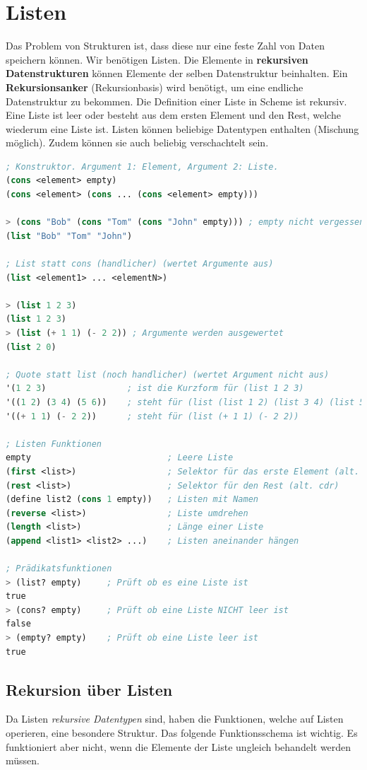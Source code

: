 \newpage

\section{Listen}
Das Problem von Strukturen ist, dass diese nur eine feste Zahl von Daten speichern können. Wir benötigen Listen. Die Elemente in \textbf{rekursiven Datenstrukturen} können Elemente der selben Datenstruktur beinhalten. Ein \textbf{Rekursionsanker} (Rekursionbasis) wird benötigt, um eine endliche Datenstruktur zu bekommen.
Die Definition einer Liste in Scheme ist rekursiv. Eine Liste ist leer oder besteht aus dem ersten Element und den Rest, welche wiederum eine Liste ist. Listen können beliebige Datentypen enthalten (Mischung möglich). Zudem können sie auch beliebig verschachtelt sein.

\begin{lstlisting}[language=Lisp, caption=Listen]
; Konstruktor. Argument 1: Element, Argument 2: Liste.
(cons <element> empty)
(cons <element> (cons ... (cons <element> empty)))

> (cons "Bob" (cons "Tom" (cons "John" empty))) ; empty nicht vergessen
(list "Bob" "Tom" "John")

; List statt cons (handlicher) (wertet Argumente aus)
(list <element1> ... <elementN>)

> (list 1 2 3)
(list 1 2 3)
> (list (+ 1 1) (- 2 2)) ; Argumente werden ausgewertet
(list 2 0)

; Quote statt list (noch handlicher) (wertet Argument nicht aus)
'(1 2 3) 				; ist die Kurzform für (list 1 2 3)
'((1 2) (3 4) (5 6)) 	; steht für (list (list 1 2) (list 3 4) (list 5 6))
'((+ 1 1) (- 2 2)) 		; steht für (list (+ 1 1) (- 2 2))

; Listen Funktionen
empty 							; Leere Liste
(first <list>) 					; Selektor für das erste Element (alt. car)
(rest <list>) 				  	; Selektor für den Rest (alt. cdr)
(define list2 (cons 1 empty)) 	; Listen mit Namen
(reverse <list>)				; Liste umdrehen
(length <list>)					; Länge einer Liste
(append <list1> <list2> ...)	; Listen aneinander hängen

; Prädikatsfunktionen
> (list? empty) 	; Prüft ob es eine Liste ist
true
> (cons? empty) 	; Prüft ob eine Liste NICHT leer ist
false
> (empty? empty) 	; Prüft ob eine Liste leer ist
true
\end{lstlisting}

\newpage
\subsection{Rekursion über Listen}
Da Listen \emph{rekursive Datentypen} sind, haben die Funktionen, welche auf Listen operieren, eine besondere Struktur. Das folgende Funktionsschema ist wichtig. Es funktioniert aber nicht, wenn die Elemente der Liste ungleich behandelt werden müssen.

